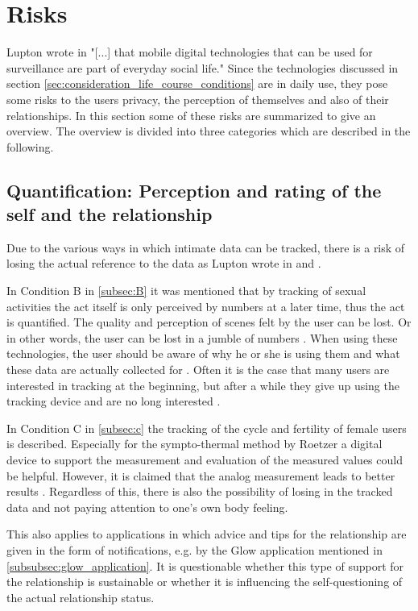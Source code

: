 \section{Risks}
\label{sec:risks}
Lupton wrote in \cite{doi:10.1080/13691058.2014.920528} "[...] that mobile digital technologies that can be used for surveillance are part of everyday social life."
Since the technologies discussed in section \ref{sec:consideration_life_course_conditions} are in daily use, they pose some risks to the users privacy, the perception of themselves and also of their relationships.
In this section some of these risks are summarized to give an overview.
The overview is divided into three categories which are described in the following.

\subsection{Quantification: Perception and rating of the self and the relationship}
Due to the various ways in which intimate data can be tracked, there is a risk of losing the actual reference to the data as Lupton wrote in  \cite{doi:10.1080/13691058.2014.920528} and \cite{lupton2016quantified}.

In Condition B in \ref{subsec:B} it was mentioned that by tracking of sexual activities the act itself is only perceived by numbers at a later time, thus the act is quantified. The quality and perception of scenes felt by the user can be lost. Or in other words, the user can be lost in a jumble of numbers \cite{kelly2017inevitable}.
When using these technologies, the user should be aware of why he or she is using them and what these data are actually collected for \cite{doi:10.1080/15265161.2017.1409823}. 
Often it is the case that many users are interested in tracking at the beginning, but after a while they give up using the tracking device and are no long interested \cite{sjoklint2015complexities}.

In Condition C in \ref{subsec:c} the tracking of the cycle and fertility of female users is described. 
Especially for the sympto-thermal method by Roetzer a digital device to support the measurement and evaluation of the measured values could be helpful. However, it is claimed that the 
analog measurement leads to better results \cite{roetzer1968erweiterte}.
Regardless of this, there is also the possibility of losing in the tracked data and not paying attention to one's own body feeling.

This also applies to applications in which advice and tips for the relationship are given in the form of notifications, e.g. by the Glow application mentioned in \ref{subsubsec:glow_application}. It is questionable whether this type of support for the relationship is sustainable or whether it is influencing the self-questioning of the actual relationship status.

